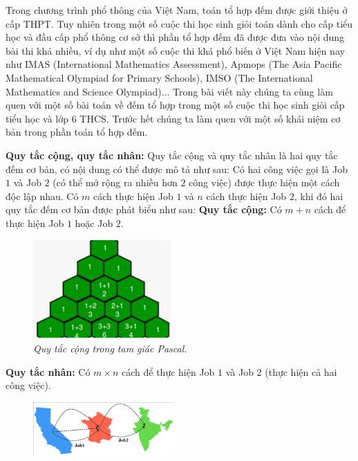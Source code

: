 \vspace*{80pt}
Trong chương trình phổ thông của Việt Nam, toán tổ hợp đếm được giới thiệu ở cấp THPT. Tuy nhiên trong một số cuộc thi học sinh giỏi toán dành cho cấp tiểu học và đầu cấp phổ thông cơ sở thì phần tổ hợp đếm đã được đưa vào nội dung bài thi khá nhiều, ví dụ như một số cuộc thi khá phổ biến ở Việt Nam hiện nay như IMAS (International Mathematics Assessment), Apmops (The Asia Pacific Mathematical Olympiad for Primary Schools), IMSO (The International Mathematics and Science Olympiad)...
\vskip 0.1cm
Trong bài viết này chúng ta cùng làm quen với một số bài toán về đếm tổ hợp trong một số cuộc thi học sinh giỏi cấp tiểu học và lớp $6$ THCS.
\vskip 0.1cm
Trước hết chúng ta làm quen với một số khái niệm cơ bản trong phần toán tổ hợp đếm.
\begin{multicols}{2}
	\textbf{\color{toancuabi}Quy tắc cộng, quy tắc nhân:} Quy tắc cộng và quy tắc nhân là hai quy tắc đếm cơ bản, có nội dung có thể được mô tả như sau:
	\vskip 0.1cm
	Có hai công việc gọi là Job $1$ và Job $2$ (có thể mở rộng ra nhiều hơn $2$ công việc) được thực hiện một cách độc lập nhau. Có $m$ cách thực hiện Job $1$ và $n$ cách thực hiện Job $2$, khi đó hai quy tắc đếm cơ bản được phát biểu như sau:
	\vskip 0.1cm
	\textbf{\color{toancuabi}Quy tắc cộng:} Có $m+n$ cách để thực hiện Job $1$ hoặc Job $2$.
	\begin{figure}[H]
		\centering
		\vspace*{-10pt}
		\captionsetup{labelformat=empty, justification=centering}
		\includegraphics[width=0.47\textwidth]{1}
		\caption{\small\textit{Quy tắc cộng trong tam giác Pascal.}}
		\vspace*{-5pt}
	\end{figure}
	\textbf{\color{toancuabi}Quy tắc nhân:} Có $m\times n$ cách để thực hiện Job $1$ và Job $2$ (thực hiện cả hai công việc).
	\begin{figure}[H]
		\centering
		\vspace*{5pt}
		\captionsetup{labelformat=empty, justification=centering}
		\includegraphics[width=0.48\textwidth]{2}

\end{figure}
\end{multicols}
